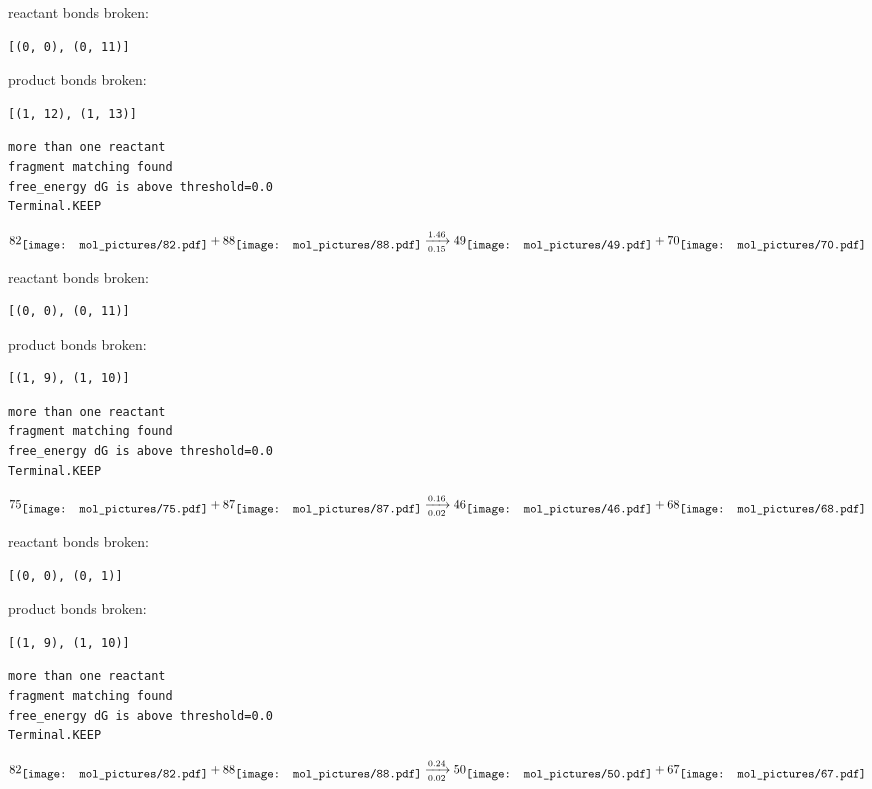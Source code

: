 \documentclass{article}
\begin{document}
reactant bonds broken:\begin{verbatim}
[(0, 0), (0, 11)]
\end{verbatim}
product bonds broken:\begin{verbatim}
[(1, 12), (1, 13)]
\end{verbatim}




\vspace{1cm}
\begin{verbatim}
more than one reactant
fragment matching found
free_energy dG is above threshold=0.0
Terminal.KEEP
\end{verbatim}
$$
82
\raisebox{-.5\height}{\texttt{[image: mol\_pictures/82.pdf]}}
+
88
\raisebox{-.5\height}{\texttt{[image: mol\_pictures/88.pdf]}}
\xrightarrow[0.15]{1.46}
49
\raisebox{-.5\height}{\texttt{[image: mol\_pictures/49.pdf]}}
+
70
\raisebox{-.5\height}{\texttt{[image: mol\_pictures/70.pdf]}}
$$


reactant bonds broken:\begin{verbatim}
[(0, 0), (0, 11)]
\end{verbatim}
product bonds broken:\begin{verbatim}
[(1, 9), (1, 10)]
\end{verbatim}




\vspace{1cm}
\begin{verbatim}
more than one reactant
fragment matching found
free_energy dG is above threshold=0.0
Terminal.KEEP
\end{verbatim}
$$
75
\raisebox{-.5\height}{\texttt{[image: mol\_pictures/75.pdf]}}
+
87
\raisebox{-.5\height}{\texttt{[image: mol\_pictures/87.pdf]}}
\xrightarrow[0.02]{0.16}
46
\raisebox{-.5\height}{\texttt{[image: mol\_pictures/46.pdf]}}
+
68
\raisebox{-.5\height}{\texttt{[image: mol\_pictures/68.pdf]}}
$$


reactant bonds broken:\begin{verbatim}
[(0, 0), (0, 1)]
\end{verbatim}
product bonds broken:\begin{verbatim}
[(1, 9), (1, 10)]
\end{verbatim}




\vspace{1cm}
\begin{verbatim}
more than one reactant
fragment matching found
free_energy dG is above threshold=0.0
Terminal.KEEP
\end{verbatim}
$$
82
\raisebox{-.5\height}{\texttt{[image: mol\_pictures/82.pdf]}}
+
88
\raisebox{-.5\height}{\texttt{[image: mol\_pictures/88.pdf]}}
\xrightarrow[0.02]{0.24}
50
\raisebox{-.5\height}{\texttt{[image: mol\_pictures/50.pdf]}}
+
67
\raisebox{-.5\height}{\texttt{[image: mol\_pictures/67.pdf]}}
$$
\end{document}
